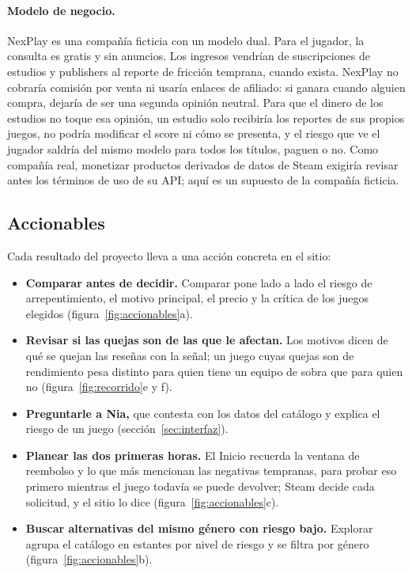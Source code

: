 \paragraph{Modelo de negocio.} NexPlay es una compañía ficticia con un modelo dual. Para el
jugador, la consulta es gratis y sin anuncios. Los ingresos vendrían de suscripciones de estudios y
publishers al reporte de fricción temprana, cuando exista. NexPlay no cobraría comisión por venta ni
usaría enlaces de afiliado: si ganara cuando alguien compra, dejaría de ser una segunda opinión
neutral. Para que el dinero de los estudios no toque esa opinión, un estudio solo recibiría los
reportes de sus propios juegos, no podría modificar el score ni cómo se presenta, y el riesgo que ve
el jugador saldría del mismo modelo para todos los títulos, paguen o no. Como compañía real,
monetizar productos derivados de datos de Steam exigiría revisar antes los términos de uso de su
API; aquí es un supuesto de la compañía ficticia.

\subsection{Accionables}\label{sec:estrategia-accionables}

Cada resultado del proyecto lleva a una acción concreta en el sitio:
\begin{itemize}
  \item \textbf{Comparar antes de decidir.} Comparar pone lado a lado el riesgo de arrepentimiento, el motivo
  principal, el precio y la crítica de los juegos elegidos (figura~\ref{fig:accionables}a).
  \item \textbf{Revisar si las quejas son de las que le afectan.} Los motivos dicen de qué se
  quejan las reseñas con la señal; un juego cuyas quejas son de rendimiento pesa distinto para
  quien tiene un equipo de sobra que para quien no (figura~\ref{fig:recorrido}e y f).
  \item \textbf{Preguntarle a Nia,} que contesta con los datos del catálogo y explica el riesgo de
  un juego (sección~\ref{sec:interfaz}).
  \item \textbf{Planear las dos primeras horas.} El Inicio recuerda la ventana de reembolso y lo
  que más mencionan las negativas tempranas, para probar eso primero mientras el juego todavía se
  puede devolver; Steam decide cada solicitud, y el sitio lo dice (figura~\ref{fig:accionables}c).
  \item \textbf{Buscar alternativas del mismo género con riesgo bajo.} Explorar agrupa el catálogo
  en estantes por nivel de riesgo y se filtra por género (figura~\ref{fig:accionables}b).
\end{itemize}

